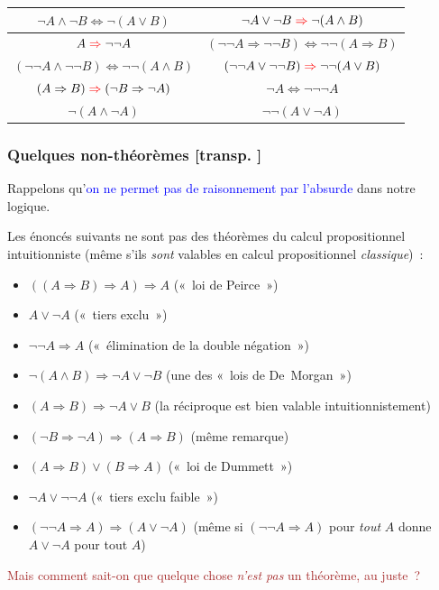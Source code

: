 \documentclass[mathserif,a4paper,aspectratio=169]{beamer}
\renewcommand{\frametitle}[1]{\subsubsection*{#1 {\footnotesize[transp. \insertframenumber]}}}
\begin{document}
\begin{frame}
{\begin{tabular}{|c|c|}
\hline
$\neg A \land \neg B \Leftrightarrow \neg(A\lor B)$&$\neg A \lor \neg B \mathrel{\color{red}\Rightarrow} \neg(A\land B)$\\
\hline
$A \mathrel{\color{red}\Rightarrow} \neg\neg A$&$(\neg\neg A\Rightarrow \neg\neg B) \Leftrightarrow \neg\neg (A\Rightarrow B)$\\
\hline
$(\neg\neg A\land \neg\neg B) \Leftrightarrow \neg\neg (A\land B)$
&$(\neg\neg A\lor \neg\neg B) \mathrel{\color{red}\Rightarrow} \neg\neg (A\lor B)$\\
\hline
$(A\Rightarrow B) \mathrel{\color{red}\Rightarrow} (\neg B\Rightarrow \neg A)$
&$\neg A \Leftrightarrow \neg\neg\neg A$\\
\hline
$\neg(A\land\neg A)$&$\neg\neg(A\lor\neg A)$\\
\hline
\end{tabular}

\par}

\end{frame}
%
\begin{frame}
\frametitle{Quelques non-théorèmes}

{\footnotesize Rappelons qu'\textcolor{blue}{on ne permet pas de
    raisonnement par l'absurde} dans notre logique.\par}

\bigskip

Les énoncés suivants \alert{ne sont pas} des théorèmes du calcul
propositionnel intuitionniste (même s'ils \emph{sont} valables en
calcul propositionnel \emph{classique}) :
\begin{itemize}
\item $((A\Rightarrow B)\Rightarrow A)\Rightarrow A$ (« loi de Peirce »)
\item $A \lor \neg A$ (« tiers exclu »)
\item $\neg\neg A \Rightarrow A$ (« élimination de la double
  négation »)
\item $\neg(A\land B) \Rightarrow \neg A\lor\neg B$ (une des « lois de
  De Morgan »)
\item $(A\Rightarrow B) \Rightarrow \neg A\lor B$ {\footnotesize (la
  réciproque est bien valable intuitionnistement)}
\item $(\neg B\Rightarrow \neg A) \Rightarrow (A\Rightarrow B)$
  {\footnotesize (même remarque)}
\item $(A\Rightarrow B) \lor (B\Rightarrow A)$ (« loi de Dummett »)
\item $\neg A \lor \neg\neg A$ (« tiers exclu faible »)
\item $(\neg\neg A \Rightarrow A) \Rightarrow (A \lor \neg A)$ {\tiny
  (même si $(\neg\neg A \Rightarrow A)$ pour \emph{tout} $A$ donne $A
  \lor \neg A$ pour tout $A$)}
\end{itemize}

\bigskip

{\footnotesize\textcolor{brown}{Mais comment sait-on que quelque chose
    \emph{n'est pas} un théorème, au juste ?}\par}

\end{frame}
\end{document}
